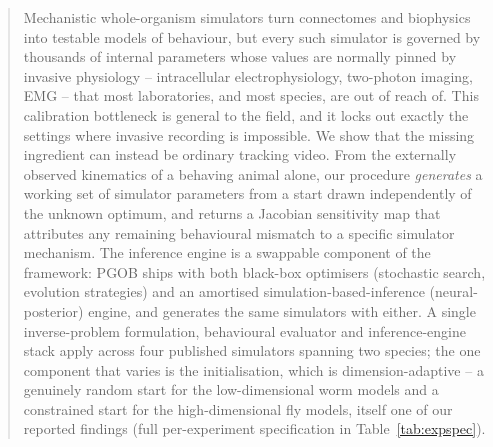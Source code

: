 \documentclass[11pt]{article}
\begin{document}
\begin{abstract}
Mechanistic whole-organism simulators turn connectomes and biophysics into testable models of behaviour, but every such simulator is governed by thousands of internal parameters whose values are normally pinned by invasive physiology -- intracellular electrophysiology, two-photon imaging, EMG -- that most laboratories, and most species, are out of reach of. This calibration bottleneck is general to the field, and it locks out exactly the settings where invasive recording is impossible. We show that the missing ingredient can instead be ordinary tracking video. From the externally observed kinematics of a behaving animal alone, our procedure \emph{generates} a working set of simulator parameters from a start drawn independently of the unknown optimum, and returns a Jacobian sensitivity map that attributes any remaining behavioural mismatch to a specific simulator mechanism. The inference engine is a swappable component of the framework: PGOB ships with both black-box optimisers (stochastic search, evolution strategies) and an amortised simulation-based-inference (neural-posterior) engine, and generates the same simulators with either. A single inverse-problem formulation, behavioural evaluator and inference-engine stack apply across four published simulators spanning two species; the one component that varies is the initialisation, which is dimension-adaptive -- a genuinely random start for the low-dimensional worm models and a constrained start for the high-dimensional fly models, itself one of our reported findings (full per-experiment specification in Table~\ref{tab:expspec}).


\end{abstract}
\end{document}
